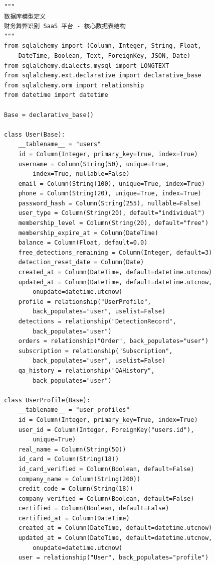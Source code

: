\documentclass[a4paper,10pt]{article}
\begin{document}
\begin{lstlisting}
"""
数据库模型定义
财务舞弊识别 SaaS 平台 - 核心数据表结构
"""
from sqlalchemy import (Column, Integer, String, Float,
    DateTime, Boolean, Text, ForeignKey, JSON, Date)
from sqlalchemy.dialects.mysql import LONGTEXT
from sqlalchemy.ext.declarative import declarative_base
from sqlalchemy.orm import relationship
from datetime import datetime

Base = declarative_base()

class User(Base):
    __tablename__ = "users"
    id = Column(Integer, primary_key=True, index=True)
    username = Column(String(50), unique=True,
        index=True, nullable=False)
    email = Column(String(100), unique=True, index=True)
    phone = Column(String(20), unique=True, index=True)
    password_hash = Column(String(255), nullable=False)
    user_type = Column(String(20), default="individual")
    membership_level = Column(String(20), default="free")
    membership_expire_at = Column(DateTime)
    balance = Column(Float, default=0.0)
    free_detections_remaining = Column(Integer, default=3)
    detection_reset_date = Column(Date)
    created_at = Column(DateTime, default=datetime.utcnow)
    updated_at = Column(DateTime, default=datetime.utcnow,
        onupdate=datetime.utcnow)
    profile = relationship("UserProfile",
        back_populates="user", uselist=False)
    detections = relationship("DetectionRecord",
        back_populates="user")
    orders = relationship("Order", back_populates="user")
    subscription = relationship("Subscription",
        back_populates="user", uselist=False)
    qa_history = relationship("QAHistory",
        back_populates="user")

class UserProfile(Base):
    __tablename__ = "user_profiles"
    id = Column(Integer, primary_key=True, index=True)
    user_id = Column(Integer, ForeignKey("users.id"),
        unique=True)
    real_name = Column(String(50))
    id_card = Column(String(18))
    id_card_verified = Column(Boolean, default=False)
    company_name = Column(String(200))
    credit_code = Column(String(18))
    company_verified = Column(Boolean, default=False)
    certified = Column(Boolean, default=False)
    certified_at = Column(DateTime)
    created_at = Column(DateTime, default=datetime.utcnow)
    updated_at = Column(DateTime, default=datetime.utcnow,
        onupdate=datetime.utcnow)
    user = relationship("User", back_populates="profile")


\end{lstlisting}
\end{document}
